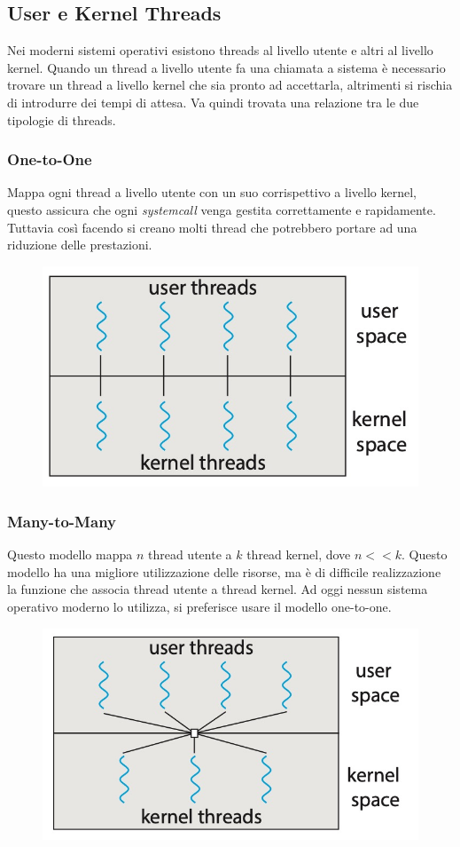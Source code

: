 \subsection{User e Kernel Threads}
Nei moderni sistemi operativi esistono threads al livello utente e altri al livello kernel.
Quando un thread a livello utente fa una chiamata a sistema è necessario trovare un thread a livello kernel che sia pronto ad accettarla, altrimenti si rischia di introdurre dei tempi di attesa.
Va quindi trovata una relazione tra le due tipologie di threads.

\subsubsection{One-to-One}
Mappa ogni thread a livello utente con un suo corrispettivo a livello kernel, questo assicura che ogni \textit{systemcall} venga gestita correttamente e rapidamente.
Tuttavia così facendo si creano molti thread che potrebbero portare ad una riduzione delle prestazioni.

\begin{figure}[H]
    \centering
    \includegraphics[width=0.35\linewidth]{assets/one-to-one.jpg}
\end{figure}

\subsubsection{Many-to-Many}
Questo modello mappa $n$ thread utente a $k$ thread kernel, dove $n << k$. Questo modello ha una migliore utilizzazione delle risorse, ma è di difficile realizzazione la funzione che associa thread utente a thread kernel.
Ad oggi nessun sistema operativo moderno lo utilizza, si preferisce usare il modello one-to-one.

\begin{figure}[H]
    \centering
    \includegraphics[width=0.35\linewidth]{assets/many-to-many.jpg}
\end{figure}

